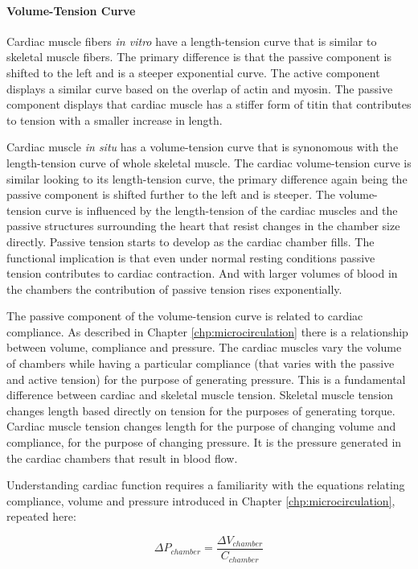 \paragraph{Volume-Tension Curve}

Cardiac muscle fibers \textit{in vitro} have a length-tension curve that is similar to skeletal muscle fibers. The primary difference is that the passive component is shifted to the left and is a steeper exponential curve. The active component displays a similar curve based on the overlap of actin and myosin. The passive component displays that cardiac muscle has a stiffer form of titin that contributes to tension with a smaller increase in length. 

Cardiac muscle \textit{in situ} has a volume-tension curve that is synonomous with the length-tension curve of whole skeletal muscle. The cardiac volume-tension curve is similar looking to its length-tension curve, the primary difference again being the passive component is shifted further to the left and is steeper. The volume-tension curve is influenced by the length-tension of the cardiac muscles and the passive structures surrounding the heart that resist changes in the chamber size directly. Passive tension starts to develop as the cardiac chamber fills. The functional implication is that even under normal resting conditions passive tension contributes to cardiac contraction. And with larger volumes of blood in the chambers the contribution of passive tension rises exponentially.

The passive component of the volume-tension curve is related to cardiac compliance. As described in Chapter \ref{chp:microcirculation} there is a relationship between volume, compliance and pressure. The cardiac muscles vary the volume of chambers while having a particular compliance (that varies with the passive and active tension) for the purpose of generating pressure. This is a fundamental difference between cardiac and skeletal muscle tension. Skeletal muscle tension changes length based directly on tension for the purposes of generating torque. Cardiac muscle tension changes length for the purpose of changing volume and compliance, for the purpose of changing pressure. It is the pressure generated in the cardiac chambers that result in blood flow.

Understanding cardiac function requires a familiarity with the equations relating compliance, volume and pressure introduced in Chapter \ref{chp:microcirculation}, repeated here:

\begin{equation}
    \Delta P_{chamber} = \frac{\Delta V_{chamber}}{C_{chamber}}
    \label{Cardiac_Pressure}
\end{equation}

